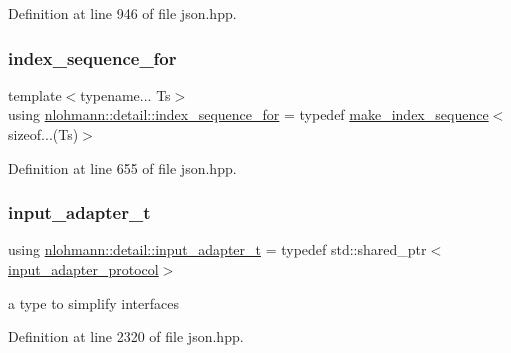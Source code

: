 Definition at line 946 of file json.\+hpp.

\mbox{\label{namespacenlohmann_1_1detail_a24800493c6ec02ce033dcbb47b7fd28e}} 
\subsubsection{\texorpdfstring{index\_sequence\_for}{index\_sequence\_for}}
{\footnotesize\ttfamily template$<$typename... Ts$>$ \\
using \mbox{\hyperlink{namespacenlohmann_1_1detail_a24800493c6ec02ce033dcbb47b7fd28e}{nlohmann\+::detail\+::index\+\_\+sequence\+\_\+for}} = typedef \mbox{\hyperlink{structnlohmann_1_1detail_1_1make__index__sequence}{make\+\_\+index\+\_\+sequence}}$<$sizeof...(Ts)$>$}



Definition at line 655 of file json.\+hpp.

\mbox{\label{namespacenlohmann_1_1detail_ae132f8cd5bb24c5e9b40ad0eafedf1c2}} 
\subsubsection{\texorpdfstring{input\_adapter\_t}{input\_adapter\_t}}
{\footnotesize\ttfamily using \mbox{\hyperlink{namespacenlohmann_1_1detail_ae132f8cd5bb24c5e9b40ad0eafedf1c2}{nlohmann\+::detail\+::input\+\_\+adapter\+\_\+t}} = typedef std\+::shared\+\_\+ptr$<$\mbox{\hyperlink{structnlohmann_1_1detail_1_1input__adapter__protocol}{input\+\_\+adapter\+\_\+protocol}}$>$}



a type to simplify interfaces 



Definition at line 2320 of file json.\+hpp.

\mbox{\label{namespacenlohmann_1_1detail_a9135fcf616d6ac6e231a86e0a055ac44}} 
